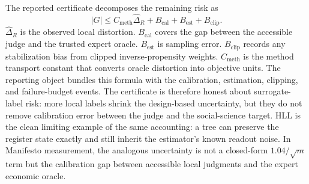 The reported certificate decomposes the remaining risk as
\[
|G|
\le
C_{\mathrm{meth}}\hat{\Delta}_R+B_{\mathrm{cal}}+B_{\mathrm{est}}+B_{\mathrm{clip}}.
\]
$\hat{\Delta}_R$ is the observed local distortion. $B_{\mathrm{cal}}$ covers
the gap between the accessible judge and the trusted expert oracle.
$B_{\mathrm{est}}$ is sampling error. $B_{\mathrm{clip}}$ records any
stabilization bias from clipped inverse-propensity weights.
$C_{\mathrm{meth}}$ is the method transport constant that converts oracle
distortion into objective units. The reporting object bundles this
formula with the calibration, estimation, clipping, and failure-budget
events. The certificate is therefore honest about
surrogate-label risk: more local labels shrink the design-based uncertainty,
but they do not remove calibration error between the judge and the
social-science target. HLL is the clean limiting example of the same
accounting: a tree can preserve the register state exactly and still inherit
the estimator's known readout noise. In Manifesto measurement, the analogous
uncertainty is not a closed-form \(1.04/\sqrt{m}\) term but the calibration
gap between accessible local judgments and the expert economic oracle.
